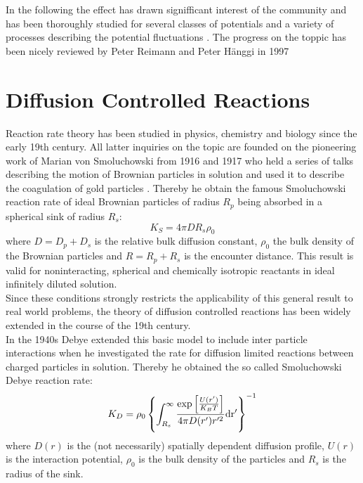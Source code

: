 In the following the effect has drawn signifficant interest of the community and has been thoroughly studied for several classes of potentials and a variety of processes describing the potential fluctuations \cite{Zurcher1993, Pechukas1994, Reimann1995, Reimann1995a}. The progress on the toppic has been nicely reviewed by Peter Reimann and Peter H\"{a}nggi in 1997 \cite{Reimann1997}

\section{Diffusion Controlled Reactions}
Reaction rate theory has been studied in physics, chemistry and biology since the early 19th century. All latter inquiries on the topic are founded on the pioneering work of Marian von Smoluchowski from 1916 and 1917 who held a series of talks \cite{Smoluchowski1916} describing the motion of Brownian particles in solution and used it to describe the coagulation of gold particles \cite{Smoluchowski1917a}. Thereby he obtain the famous Smoluchowski reaction rate of ideal Brownian particles of radius $R_p$ being absorbed in a spherical sink of radius $R_s$:\\
\begin{equation}
    K_S = 4 \pi D R_s \rho_0 \nonumber
    \label{Ksintro}
\end{equation}
where $D = D_p + D_s$ is the relative bulk diffusion constant, $\rho_0$ the bulk density of the Brownian particles and $R = R_p + R_s$ is the encounter distance. This result is valid for noninteracting, spherical and chemically isotropic reactants in ideal infinitely diluted solution. \\ 
Since these conditions strongly restricts the applicability of this general result to real world problems, the theory of diffusion controlled reactions has been widely extended in the course of the 19th century.\\
In the 1940s Debye \cite{Debye1942} extended this basic model to include inter particle interactions when he investigated the rate for diffusion limited reactions between charged particles in solution. Thereby he obtained the so called Smoluchowski Debye reaction rate:
\begin{equation}
    K_D = \rho_0\left\{\int_{R_s}^{\infty} \frac{\exp \left[ \frac{U(r')}{K_B T}\right]}{4 \pi D(r') r'^2} \rm d r' \right\}^{-1} \nonumber \nonumber
    \label{Kdintro}
\end{equation}
where $D(r)$ is the (not necessarily) spatially dependent diffusion profile, $U(r)$ is the interaction potential, $\rho_0$ is the bulk density of the particles and $R_s$ is the radius of the sink. \\
